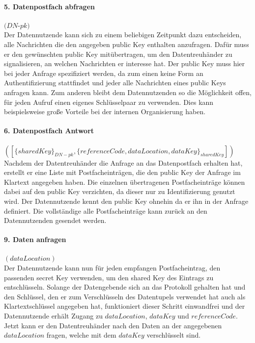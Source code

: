 \documentclass{scrreprt}
\begin{document}
\paragraph{5. Datenpostfach abfragen} $(DN$-$pk)$\\
Der Datennutzende kann sich zu einem beliebigen Zeitpunkt dazu entscheiden, alle Nachrichten die den angegeben public Key enthalten anzufragen. Dafür muss er den gewünschten public Key mitübertragen, um den Datentreuhänder zu signalisieren, an welchen Nachrichten er interesse hat. Der public Key muss hier bei jeder Anfrage spezifiziert werden, da zum einen keine Form an Authentifizierung stattfindet und jeder alle Nachrichten eines public Keys anfragen kann. Zum anderen bleibt dem Datennutzenden so die Möglichkeit offen, für jeden Aufruf einen eigenes Schlüsselpaar zu verwenden. Dies kann beispielsweise große Vorteile bei der internen Organisierung haben.

\paragraph{6. Datenpostfach Antwort} $([\{sharedKey\}_{DN-pk}, \{referenceCode, dataLocation, dataKey\}_{sharedKey}])$\\
Nachdem der Datentreuhänder die Anfrage an das Datenpostfach erhalten hat, erstellt er eine Liste mit Postfacheinträgen, die den public Key der Anfrage im Klartext angegeben haben. Die einzelnen übertragenen Postfacheinträge können dabei auf den public Key verzichten, da dieser nur zu Identifizierung genutzt wird. Der Datennutzende kennt den public Key ohnehin da er ihn in der Anfrage definiert. Die vollständige alle Postfacheinträge kann zurück an den Datennutzenden gesendet werden.

\paragraph{9. Daten anfragen} $(dataLocation)$\\
Der Datennutzende kann nun für jeden empfangen Postfacheintrag, den passenden secret Key verwenden, um den shared Key des Eintrags zu entschlüsseln. Solange der Datengebende sich an das Protokoll gehalten hat und den Schlüssel, den er zum Verschlüsseln des Datentupels verwendet hat auch als Klartextschlüssel angegeben hat, funktioniert dieser Schritt einwandfrei und der Datennutzende erhält Zugang zu $dataLocation$, $dataKey$ und $referenceCode$. Jetzt kann er den Datentreuhänder nach den Daten an der angegebenen $dataLocation$ fragen, welche mit dem $dataKey$ verschlüsselt sind.
\end{document}
